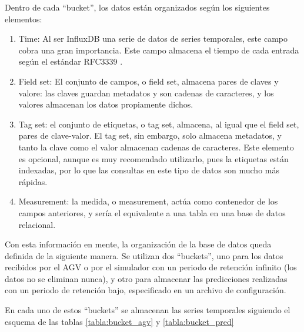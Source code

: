 Dentro de cada ``bucket'', los datos están organizados según los siguientes elementos:
\begin{enumerate}
    \item Time: Al ser InfluxDB una serie de datos de series temporales, este campo cobra 
        una gran importancia. Este campo almacena el tiempo de cada entrada según el estándar
        RFC3339 \cite{rfc3339}.
    \item Field set: El conjunto de campos, o field set, almacena pares de claves y valore: las 
        claves guardan metadatos y son cadenas de caracteres, y los valores almacenan los datos 
        propiamente dichos. 
    \item Tag set: el conjunto de etiquetas, o tag set, almacena, al igual que el field set, pares 
        de clave-valor. El tag set, sin embargo, solo almacena metadatos, y tanto la clave como el
        valor almacenan cadenas de caracteres. Este elemento es opcional, aunque es muy recomendado 
        utilizarlo, pues la etiquetas están indexadas, por lo que las consultas en este tipo de datos 
        son mucho más rápidas.
    \item Measurement: la medida, o measurement, actúa como contenedor de los campos anteriores, 
        y sería el equivalente a una tabla en una base de datos relacional.
\end{enumerate}

Con esta información en mente, la organización de la base de datos queda definida de la siguiente 
manera. Se utilizan dos ``buckets'', uno para los datos recibidos por el AGV o por el simulador con 
un periodo de retención infinito (los datos no se eliminan nunca), y otro para almacenar las predicciones 
realizadas con un periodo de retención bajo, especificado en un archivo de configuración. 

En cada uno de estos ``buckets'' se almacenan las series temporales siguiendo el esquema de las 
tablas \ref{tabla:bucket_agv} y \ref{tabla:bucket_pred}


